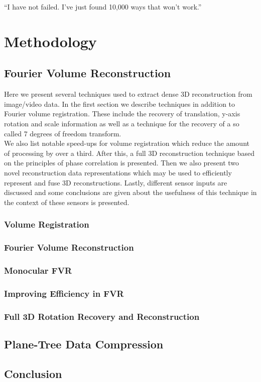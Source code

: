 \begin{savequote}[8cm]
  ``I have not failed. I've just found 10,000 ways that won't work.''
\end{savequote}
\makeatletter
\chapter{Methodology}


\section{Fourier Volume Reconstruction}
\label{FVRSectionA}

Here we present several techniques used to extract dense 3D reconstruction from image/video data. In the first section we describe techniques in addition to Fourier volume registration. These include the recovery of translation, y-axis rotation and scale information as well as a technique for the recovery of a so called 7 degrees of freedom transform. \\

We also list notable speed-ups for volume registration which reduce the amount of processing by over a third. After this, a full 3D reconstruction technique based on the principles of phase correlation is presented. Then we also present two novel reconstruction data representations which may be used to efficiently represent and fuse 3D reconstructions. Lastly, different sensor inputs are discussed and some conclusions are given about the usefulness of this technique in the context of these sensors is presented.

\subsection{Volume Registration}

\subsection{Fourier Volume Reconstruction}

\subsection{Monocular FVR}

\subsection{Improving Efficiency in FVR}

\subsection{Full 3D Rotation Recovery and Reconstruction}


\section{Plane-Tree Data Compression}



\section{Conclusion}